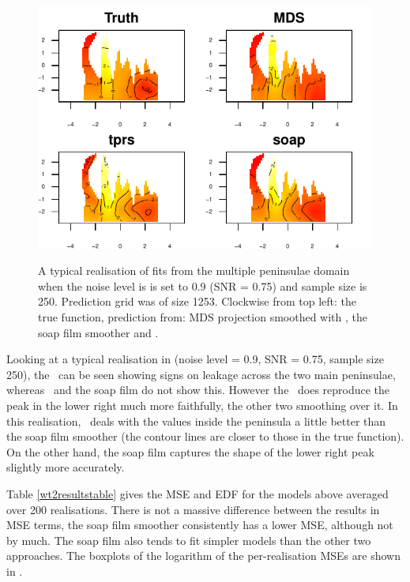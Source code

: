 \begin{figure}
\centering
\includegraphics[width=6in]{mds/figs/wt2-comp-09.pdf} \\
\caption{A typical realisation of fits from the multiple peninsulae domain when the noise level is  is set to 0.9 (SNR = 0.75) and sample size is 250. Prediction grid was of size 1253. Clockwise from top left: the true function, prediction from: MDS projection smoothed with \tprs, the soap film smoother and \tprs.}
\label{wt2-comp-0.9}
\end{figure}

Looking at a typical realisation in  (noise level = 0.9, SNR = 0.75, sample size 250), the \tprs\ can be seen showing signs on leakage across the two main peninsulae, whereas \mdsap\ and the soap film do not show this. However the \tprs\ does reproduce the peak in the lower right much more faithfully, the other two smoothing over it. In this realisation, \mdsap\ deals with the values inside the peninsula a little better than the soap film smoother (the contour lines are closer to those in the true function). On the other hand, the soap film captures the shape of the lower right peak slightly more accurately.

Table \ref{wt2resultstable} gives the MSE and EDF for the models above averaged over 200 realisations. There is not a massive difference between the results in MSE terms, the soap film smoother consistently has a lower MSE, although not by much. The soap film also tends to fit simpler models than the other two approaches. The boxplots of the logarithm of the per-realisation MSEs are shown in .

